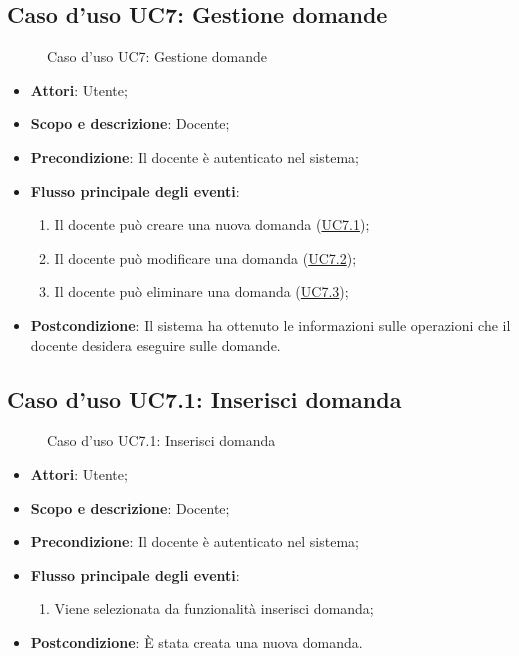 \documentclass[12pt,a4paper]{article}
\begin{document}
\subsection{Caso d'uso UC7: Gestione domande}
\begin{figure}[H]
	\centering

	\caption{Caso d'uso UC7: Gestione domande}\label{fig:UC7} 
\end{figure}\begin{itemize}
\item \textbf{Attori}: Utente;
\item \textbf{Scopo e descrizione}: Docente; 
\item \textbf{Precondizione}: Il docente è autenticato nel sistema;

\item \textbf{Flusso principale degli eventi}:
\begin{enumerate}
	\item Il docente può creare una nuova domanda (\hyperlink{UC7.1}{UC7.1});
	\item Il docente può modificare una domanda (\hyperlink{UC7.2}{UC7.2});
	\item Il docente può eliminare una domanda (\hyperlink{UC7.3}{UC7.3});
	
\end{enumerate}
\item \textbf{Postcondizione}: Il sistema ha ottenuto le informazioni sulle operazioni che il docente desidera eseguire sulle domande.
\end{itemize}
\hypertarget{UC7.1}{}
\subsection{Caso d'uso UC7.1: Inserisci domanda}
\begin{figure}[H]
	\centering

	\caption{Caso d'uso UC7.1: Inserisci domanda}\label{fig:UC7.1} 
\end{figure}\begin{itemize}
\item \textbf{Attori}: Utente;
\item \textbf{Scopo e descrizione}: Docente; 
\item \textbf{Precondizione}: Il docente è autenticato nel sistema;

\item \textbf{Flusso principale degli eventi}:
\begin{enumerate}
	\item Viene selezionata da funzionalità inserisci domanda;
	
\end{enumerate}
\item \textbf{Postcondizione}: È stata creata una nuova domanda.
\end{itemize}
\hypertarget{UC7.2}{}
\end{document}
